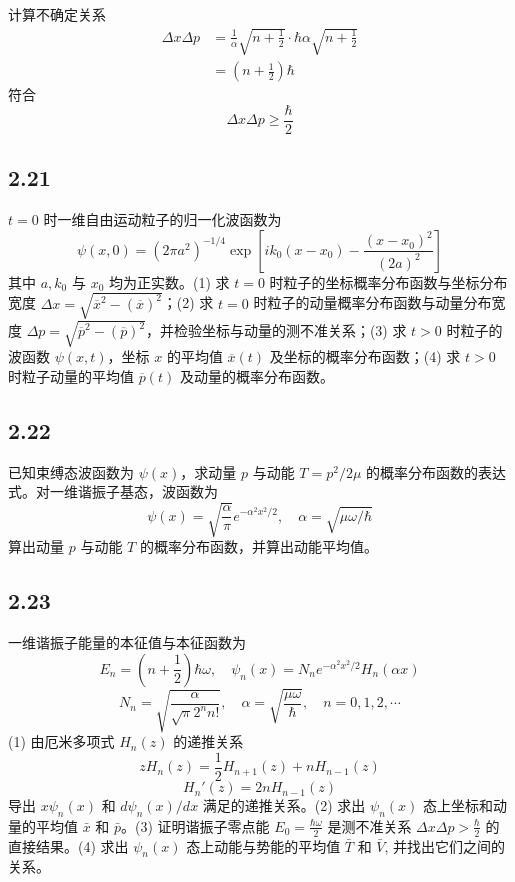 计算不确定关系
\begin{equation}
    \begin{aligned}
        \Delta x\Delta p&=\frac{1}{\alpha}\sqrt{n+\frac{1}{2}}\cdot \hbar \alpha \sqrt{n+\frac{1}{2}}
\\
&=\left( n+\frac{1}{2} \right) \hbar 
    \end{aligned}
\end{equation}
符合
\begin{equation}
    \Delta x\Delta p\geqslant \frac{\hbar}{2}
\end{equation}





\subsection{2.21}
$t = 0$ 时一维自由运动粒子的归一化波函数为
$$\psi (x, 0) = (2\pi a^2)^{-1/4} \exp \left[ i k_0 (x - x_0) - \frac{(x - x_0)^2}{(2a)^2} \right]$$
其中 $a, k_0$ 与 $x_0$ 均为正实数。(1) 求 $t = 0$ 时粒子的坐标概率分布函数与坐标分布宽度 $\Delta x = \sqrt{\overline{x}^2 - (\overline{x})^2}$；(2) 求 $t = 0$ 时粒子的动量概率分布函数与动量分布宽度 $\Delta p = \sqrt{\overline{p}^2 - (\overline{p})^2}$，并检验坐标与动量的测不准关系；(3) 求 $t > 0$ 时粒子的波函数 $\psi (x, t)$，坐标 $x$ 的平均值 $\overline{x}(t)$ 及坐标的概率分布函数；(4) 求 $t > 0$ 时粒子动量的平均值 $\overline{p}(t)$ 及动量的概率分布函数。

\subsection{2.22}
已知束缚态波函数为 $\psi(x)$，求动量 $p$ 与动能 $T = p^2 / 2\mu$ 的概率分布函数的表达式。对一维谐振子基态，波函数为
$$\psi(x) = \sqrt{\frac{\alpha}{\pi}} e^{-\alpha^2 x^2 / 2}, \quad \alpha = \sqrt{\mu \omega / \hbar}$$
算出动量 $p$ 与动能 $T$ 的概率分布函数，并算出动能平均值。

\subsection{2.23}
一维谐振子能量的本征值与本征函数为
$$E_n = \left( n + \frac{1}{2} \right) \hbar \omega, \quad \psi_n(x) = N_n e^{-\alpha^2 x^2 / 2} H_n (\alpha x)$$
$$N_n = \sqrt{\frac{\alpha}{\sqrt{\pi} 2^n n!}}, \quad \alpha = \sqrt{\frac{\mu \omega}{\hbar}}, \quad n = 0, 1, 2, \cdots$$
(1) 由厄米多项式 $H_n(z)$ 的递推关系
$$zH_n(z) = \frac{1}{2} H_{n+1}(z) + nH_{n-1}(z)$$
$$H_n'(z) = 2nH_{n-1}(z)$$
导出 $x \psi_n(x)$ 和 $d \psi_n(x) / dx$ 满足的递推关系。(2) 求出 $\psi_n(x)$ 态上坐标和动量的平均值 $\bar{x}$ 和 $\bar{p}$。(3) 证明谐振子零点能 $E_0 = \frac{\hbar \omega}{2}$ 是测不准关系 $\Delta x \Delta p > \frac{\hbar}{2}$ 的直接结果。(4) 求出 $\psi_n(x)$ 态上动能与势能的平均值 $\bar{T}$ 和 $\bar{V}$, 并找出它们之间的关系。

